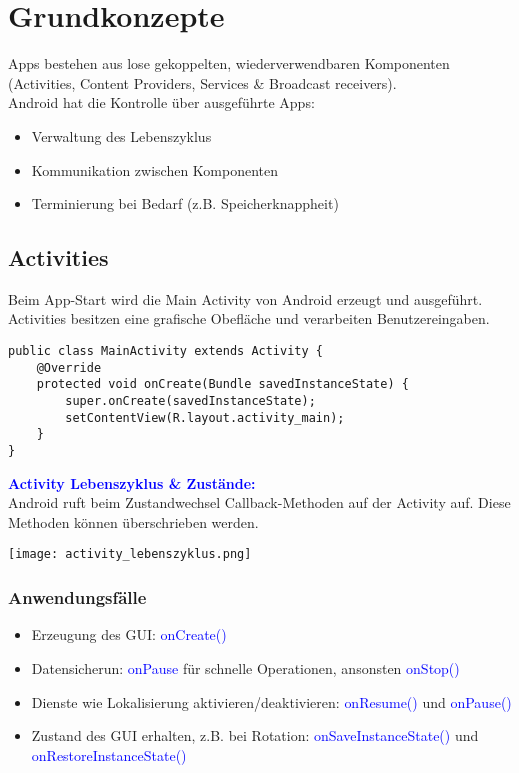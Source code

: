 
\section{Grundkonzepte}
Apps bestehen aus lose gekoppelten, wiederverwendbaren Komponenten (Activities, Content Providers, Services \& Broadcast receivers).\\
Android hat die Kontrolle über ausgeführte Apps:
\begin{itemize}[topsep=0pt, leftmargin=4mm]
    \setlength\itemsep{-0.3em}
    \item Verwaltung des Lebenszyklus
    \item Kommunikation zwischen Komponenten
    \item Terminierung bei Bedarf (z.B. Speicherknappheit)
\end{itemize}
\subsection{Activities}
Beim App-Start wird die Main Activity von Android erzeugt und ausgeführt. Activities besitzen eine grafische Obefläche und verarbeiten Benutzereingaben.
\begin{lstlisting}
public class MainActivity extends Activity {
    @Override
    protected void onCreate(Bundle savedInstanceState) {
        super.onCreate(savedInstanceState);
        setContentView(R.layout.activity_main);
    }
}
\end{lstlisting}
\textbf{\textcolor{blue}{Activity Lebenszyklus \& Zustände:}}\\
Android ruft beim Zustandwechsel Callback-Methoden auf der Activity auf. Diese Methoden können überschrieben werden.
\begin{center}
    \texttt{[image: activity\_lebenszyklus.png]}
\end{center}
\subsubsection{Anwendungsfälle}
\begin{itemize}[topsep=0pt, leftmargin=4mm]
    \setlength\itemsep{-0.3em}
    \item Erzeugung des GUI: \textcolor{blue}{onCreate()}
    \item Datensicherun: \textcolor{blue}{onPause} für schnelle Operationen, ansonsten \textcolor{blue}{onStop()}
    \item Dienste wie Lokalisierung aktivieren/deaktivieren: \textcolor{blue}{onResume()} und \textcolor{blue}{onPause()}
    \item Zustand des GUI erhalten, z.B. bei Rotation: \textcolor{blue}{onSaveInstanceState()} und \textcolor{blue}{onRestoreInstanceState()}
\end{itemize}
